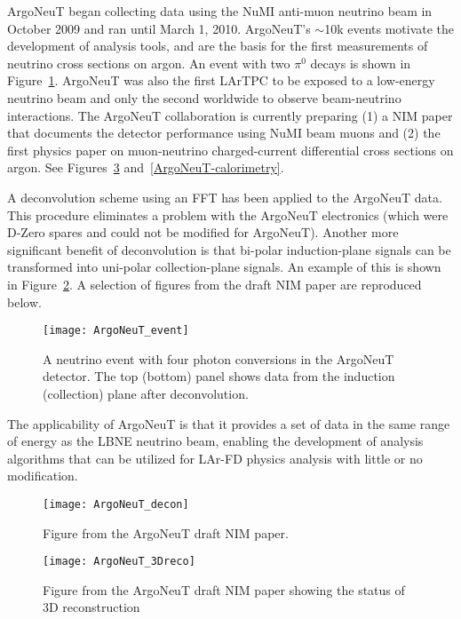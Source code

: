 ArgoNeuT began collecting data using the NuMI anti-muon neutrino beam in October 2009 and ran until  March 1, 2010.  ArgoNeuT's $\sim$10k events motivate the development of analysis tools, and are the basis for the first measurements of neutrino cross sections on argon.   An event with two $\pi^{0}$ decays is shown in Figure~\ref{2pi0}.   ArgoNeuT was also the first LArTPC to be exposed to a low-energy neutrino beam and only the second worldwide to observe beam-neutrino interactions. The ArgoNeuT collaboration is currently preparing (1) a NIM paper that documents the detector performance using NuMI beam muons and (2) the first physics paper on muon-neutrino charged-current differential cross sections on argon.  See Figures~\ref{ArgoNeuT_3Dreco} and~\ref{ArgoNeuT-calorimetry}.

A deconvolution scheme using an FFT has been applied to the ArgoNeuT data. This procedure eliminates a problem with the ArgoNeuT electronics (which were D-Zero spares and could not be modified for ArgoNeuT). Another more significant benefit of deconvolution is that bi-polar induction-plane signals can be transformed into uni-polar collection-plane signals. An example of this is shown in Figure~\ref{Argo-decon}. A selection of figures from the draft NIM paper are reproduced below.


\begin{figure}
\centering 
{\texttt{[image: ArgoNeuT\_event]}}
\caption[ArgoNeuT neutrino event with four photon conversions]{A neutrino event with four photon conversions in the ArgoNeuT detector. The top (bottom) panel shows data from the induction (collection) plane after deconvolution. }
\label{2pi0}
\end{figure}


The applicability of ArgoNeuT is that it provides a set of data in the same range of energy as the LBNE neutrino beam, enabling the development of analysis algorithms that can be utilized for LAr-FD physics analysis with little or no modification.


\begin{figure}
\centering 
{\texttt{[image: ArgoNeuT\_decon]}}
\caption[Data from ArgoNeuT]{Figure from the ArgoNeuT draft NIM paper. } %
\label{Argo-decon}
\end{figure}

\begin{figure}
\centering 
{\texttt{[image: ArgoNeuT\_3Dreco]}}
\caption[ArgoNeuT: status of 3D reconstruction]{Figure from the ArgoNeuT draft NIM paper showing the status of 3D reconstruction} %
\label{ArgoNeuT_3Dreco}
\end{figure}

